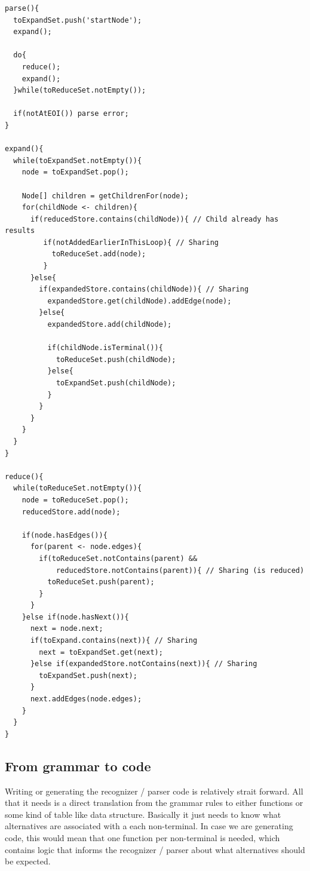 \documentclass[a4paper,10pt]{article}
\begin{document}
{\small
\begin{verbatim}
parse(){
  toExpandSet.push('startNode');
  expand();
  
  do{
    reduce();
    expand();
  }while(toReduceSet.notEmpty());
  
  if(notAtEOI()) parse error;
}

expand(){
  while(toExpandSet.notEmpty()){
    node = toExpandSet.pop();
    
    Node[] children = getChildrenFor(node);
    for(childNode <- children){
      if(reducedStore.contains(childNode)){ // Child already has results
         if(notAddedEarlierInThisLoop){ // Sharing
           toReduceSet.add(node);
         }
      }else{
        if(expandedStore.contains(childNode)){ // Sharing
          expandedStore.get(childNode).addEdge(node);
        }else{
          expandedStore.add(childNode);
          
          if(childNode.isTerminal()){
            toReduceSet.push(childNode);
          }else{
            toExpandSet.push(childNode);
          }
        }
      }
    }
  }
}

reduce(){
  while(toReduceSet.notEmpty()){
    node = toReduceSet.pop();
    reducedStore.add(node);
    
    if(node.hasEdges()){
      for(parent <- node.edges){
        if(toReduceSet.notContains(parent) &&
            reducedStore.notContains(parent)){ // Sharing (is reduced)
          toReduceSet.push(parent);
        }
      }
    }else if(node.hasNext()){
      next = node.next;
      if(toExpand.contains(next)){ // Sharing
        next = toExpandSet.get(next);
      }else if(expandedStore.notContains(next)){ // Sharing
        toExpandSet.push(next);
      }
      next.addEdges(node.edges);
    }
  }
}
\end{verbatim}
}

\subsection{From grammar to code}

Writing or generating the recognizer / parser code is relatively strait forward. All that it needs is a direct translation from the grammar rules to either functions or some kind of table like data structure. Basically it just needs to know what alternatives are associated with a each non-terminal. In case we are generating code, this would mean that one function per non-terminal is needed, which contains logic that informs the recognizer / parser about what alternatives should be expected.
\end{document}
